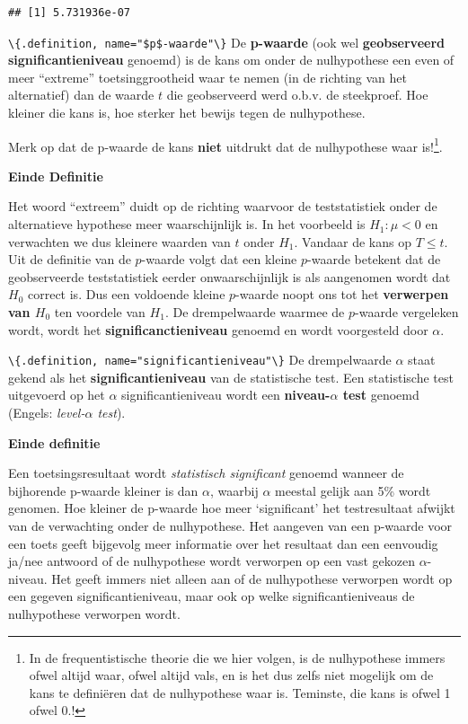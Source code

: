 \documentclass[
  12pt,dutch,coursenotes]{book}
\newcommand{\passthrough}[1]{#1}
\begin{document}
\begin{lstlisting}
## [1] 5.731936e-07
\end{lstlisting}

\passthrough{\lstinline!\{.definition, name="$p$-waarde"\}!}
De \textbf{p-waarde} (ook wel \textbf{geobserveerd significantieniveau} genoemd) is de
kans om onder de nulhypothese een even of meer ``extreme'' toetsinggrootheid
waar te nemen (in de richting van het alternatief) dan de waarde \(t\) die
geobserveerd werd o.b.v. de steekproef. Hoe kleiner die kans is, hoe sterker het bewijs tegen de
nulhypothese.

Merk op dat de p-waarde de kans \textbf{niet} uitdrukt dat de nulhypothese waar is!\footnote{In de frequentistische theorie die we hier volgen, is de nulhypothese immers ofwel altijd waar, ofwel altijd vals, en is het dus zelfs niet mogelijk om de kans te definiëren dat de nulhypothese waar is. Teminste, die kans is ofwel 1 ofwel 0.!}.

\textbf{Einde Definitie}

Het woord ``extreem'' duidt op de richting waarvoor de teststatistiek onder de alternatieve hypothese meer waarschijnlijk is. In het voorbeeld is \(H_1: \mu < 0\) en verwachten we dus kleinere waarden van \(t\) onder \(H_1\). Vandaar de kans op \(T\leq t\).
Uit de definitie van de \(p\)-waarde volgt dat een kleine \(p\)-waarde betekent dat de geobserveerde teststatistiek eerder onwaarschijnlijk is als aangenomen wordt dat \(H_0\) correct is.
Dus een voldoende kleine \(p\)-waarde noopt ons tot het \textbf{verwerpen van \(H_0\)} ten voordele van \(H_1\).
De drempelwaarde waarmee de \(p\)-waarde vergeleken wordt, wordt het \textbf{significanctieniveau} genoemd en wordt voorgesteld door \(\alpha\).

\passthrough{\lstinline!\{.definition, name="significantieniveau"\}!}
De drempelwaarde \(\alpha\) staat gekend als het \textbf{significantieniveau} van de statistische test. Een statistische test uitgevoerd op het \(\alpha\) significantieniveau wordt een \textbf{niveau-\(\alpha\) test} genoemd (Engels: \emph{level-\(\alpha\) test}).

\textbf{Einde definitie}

Een toetsingsresultaat wordt \emph{statistisch significant} genoemd
wanneer de bijhorende p-waarde kleiner is dan \(\alpha\), waarbij \(\alpha\)
meestal gelijk aan 5\% wordt genomen. Hoe kleiner de p-waarde hoe meer
`significant' het testresultaat afwijkt van de verwachting onder de
nulhypothese. Het aangeven van een p-waarde voor een toets geeft bijgevolg
meer informatie over het resultaat dan een eenvoudig ja/nee antwoord of de
nulhypothese wordt verworpen op een vast gekozen \(\alpha\)-niveau. Het geeft immers niet alleen aan of de nulhypothese verworpen wordt op een gegeven significantieniveau, maar ook op welke significantieniveaus de nulhypothese verworpen wordt.
\end{document}
